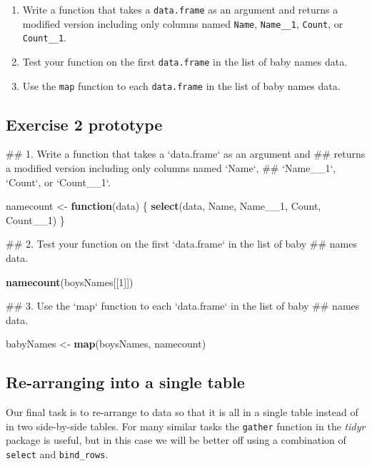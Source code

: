 \documentclass[]{book}
\newenvironment{Shaded}{\begin{snugshade}}{\end{snugshade}}
\newcommand{\KeywordTok}[1]{\textcolor[rgb]{0.13,0.29,0.53}{\textbf{#1}}}
\newcommand{\DecValTok}[1]{\textcolor[rgb]{0.00,0.00,0.81}{#1}}
\newcommand{\StringTok}[1]{\textcolor[rgb]{0.31,0.60,0.02}{#1}}
\newcommand{\ControlFlowTok}[1]{\textcolor[rgb]{0.13,0.29,0.53}{\textbf{#1}}}
\newcommand{\NormalTok}[1]{#1}
\begin{document}
\begin{enumerate}
\def\labelenumi{\arabic{enumi}.}
\item
  Write a function that takes a \texttt{data.frame} as an argument and
  returns a modified version including only columns named \texttt{Name},
  \texttt{Name\_\_1}, \texttt{Count}, or \texttt{Count\_\_1}.
\item
  Test your function on the first \texttt{data.frame} in the list of
  baby names data.
\item
  Use the \texttt{map} function to each \texttt{data.frame} in the list
  of baby names data.
\end{enumerate}

\subsection{Exercise 2 prototype}\label{exercise-2-prototype-1}

\begin{Shaded}
\begin{Highlighting}[]
\NormalTok{  ## 1. Write a function that takes a `data.frame` as an argument and}
\NormalTok{  ##    returns a modified version including only columns named `Name`,}
\NormalTok{  ##    `Name__1`, `Count`, or `Count__1`.}

\NormalTok{  namecount <-}\StringTok{ }\ControlFlowTok{function}\NormalTok{(data) \{}
      \KeywordTok{select}\NormalTok{(data, Name, Name__}\DecValTok{1}\NormalTok{, Count, Count__}\DecValTok{1}\NormalTok{)}
\NormalTok{  \}}
     
\NormalTok{  ## 2. Test your function on the first `data.frame` in the list of baby}
\NormalTok{  ##    names data.}

  \KeywordTok{namecount}\NormalTok{(boysNames[[}\DecValTok{1}\NormalTok{]])}
  
\NormalTok{  ## 3. Use the `map` function to each `data.frame` in the list of baby}
\NormalTok{  ##    names data.}

\NormalTok{  babyNames <-}\StringTok{ }\KeywordTok{map}\NormalTok{(boysNames, namecount)}
\end{Highlighting}
\end{Shaded}

\subsection{Re-arranging into a single
table}\label{re-arranging-into-a-single-table}

Our final task is to re-arrange to data so that it is all in a single
table instead of in two side-by-side tables. For many similar tasks the
\texttt{gather} function in the \emph{tidyr} package is useful, but in
this case we will be better off using a combination of \texttt{select}
and \texttt{bind\_rows}.
\end{document}
